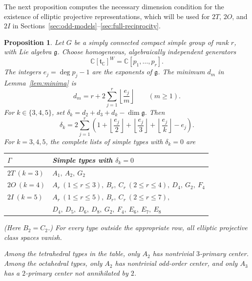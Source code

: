 \documentclass[11pt,a4paper,reqno]{amsart}
\theoremstyle{plain}
\newtheorem{proposition}[theorem]{Proposition}
\theoremstyle{definition}
\theoremstyle{remark}
\numberwithin{equation}{section}
\newcommand{\CC}{\mathbb C}
\newcommand{\fg}{\mathfrak g}
\newcommand{\ft}{\mathfrak t}
\begin{document}
The next proposition computes the necessary dimension condition for
the existence of elliptic projective representations, which will be used for $2T$, $2O$, and $2I$ in Sections~\ref{sec:odd-models}--\ref{sec:full-reciprocity}.

\begin{proposition}\label{prop:defect-screen}
Let $G$ be a simply connected compact simple group of rank $r$, with Lie algebra $\fg$. Choose homogeneous, algebraically independent generators
\[
\CC[\ft_{\CC}]^W=\CC[p_1,\ldots,p_r].
\]
The integers $e_j=\deg p_j-1$ are the exponents of $\fg$. The minimum $d_m$ in Lemma~\ref{lem:minima} is
\begin{equation}\label{eq:exponent-minima}
d_m=r+2\sum_{j=1}^r\left\lfloor\frac{e_j}{m}\right\rfloor
\qquad(m\ge1).
\end{equation}
For $k\in\{3,4,5\}$, set
$\delta_k=d_2+d_3+d_k-\dim\fg$. Then
\begin{equation}\label{eq:exponent-defect}
\delta_k=2\sum_{j=1}^r
\left(
1+\left\lfloor\frac{e_j}{2}\right\rfloor
+\left\lfloor\frac{e_j}{3}\right\rfloor
+\left\lfloor\frac{e_j}{k}\right\rfloor-e_j
\right).
\end{equation}
For $k=3,4,5$, the complete lists of simple types with $\delta_k=0$ are
\begin{center}
\begin{tabular}{ll}
\toprule
$\Gamma$ & Simple types with $\delta_k=0$\\
\midrule
$2T\ (k=3)$ & $A_1,\ A_2,\ G_2$\\
$2O\ (k=4)$ & $A_r\ (1\le r\le3),\ B_r,\ C_r\ (2\le r\le4),\ D_4,\ G_2,\ F_4$\\
$2I\ (k=5)$ & $A_r\ (1\le r\le5),\ B_r,\ C_r\ (2\le r\le7),$\\
 & $D_4,\ D_5,\ D_6,\ D_8,\ G_2,\ F_4,\ E_6,\ E_7,\ E_8$\\
\bottomrule
\end{tabular}
\end{center}
(Here $B_2=C_2$.)
For every type outside the appropriate row, all elliptic projective class
spaces vanish.

Among the tetrahedral types in the table, only $A_2$ has nontrivial
$3$-primary center. Among the octahedral types, only $A_2$ has nontrivial
odd-order center, and only $A_3$ has a $2$-primary center not annihilated
by $2$.
\end{proposition}
\end{document}
